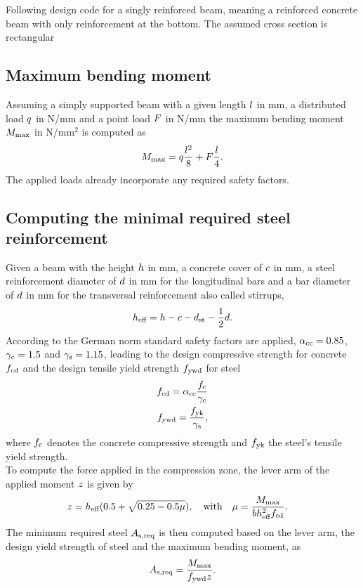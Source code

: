 Following design code \citeauthor{DIN1992-1-1} for a singly reinforced beam, meaning a reinforced concrete beam with only reinforcement at the bottom.
The assumed cross section is rectangular

\subsection{Maximum bending moment}
Assuming a simply supported beam with a given length $l$ in mm, a distributed load $q$ in N/mm and a point load $F$ in N/mm
the maximum bending moment $M_{\text{max}}$ in N/mm$^2$ is computed as
\begin{align}
	M_{\text{max}}= q \frac{l^2}{8} + F \frac{l}{4}.
\end{align}
The applied loads already incorporate any required safety factors.
\subsection{Computing the minimal required steel reinforcement}
Given a beam with the height $h$ in mm, a concrete cover of $c$ in mm, a steel reinforcement diameter of $d$ in mm for the longitudinal bars and a bar diameter of $d$ in mm for the transversal reinforcement also called stirrups,
\begin{align}
	h_{\text{eff}} = h - c - d_{\text{st}} - \frac{1}{2} d.
\end{align}
According to the German norm standard safety factors are applied, $\alpha_{\text{cc}} = 0.85$, $\gamma_{\text{c}} = 1.5$ and $\gamma_{\text{s}} = 1.15$, leading to the design compressive strength for concrete $f_{\text{cd}}$ and  the design tensile yield strength $f_{\text{ywd}}$ for steel
\begin{align}
	f_{\text{cd}} = \alpha_{\text{cc}} \frac{f_{\text{c}} }{\gamma_{\text{c}}}\\
	f_{\text{ywd}} = \frac{f_{\text{yk}}}{\gamma_{\text{s}}},
\end{align}
where $f_{\text{c}}$ denotes the concrete compressive strength and $f_{\text{yk}}$ the steel's tensile yield strength.\\
To compute the force applied in the compression zone, the lever arm of the applied moment $z$ is given by 
\begin{align}
	z &= h_{\text{eff}}(0.5+\sqrt{0.25-0.5 \mu}),\quad \text{with}\quad
	\mu = \frac{M_{\text{max}} }{b h_{\text{eff}}^2 f_{\text{cd}}}. \label{eq:compr_str_constr}
\end{align}
The minimum required steel $A_{\text{s,req}}$ is then computed based on the lever arm, the design yield strength of steel and the maximum bending moment, as
\begin{align}
	A_{\text{s,req}} = \frac{M_{\text{max}}}{f_{\text{ywd}} z}.\label{eq:Areq}
\end{align}
